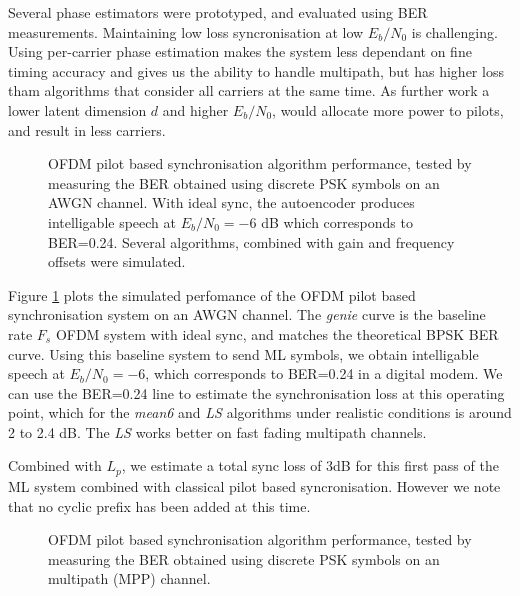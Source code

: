 \documentclass{article}
\begin{document}
Several phase estimators were prototyped, and evaluated using BER measurements. Maintaining low loss syncronisation at low $E_b/N_0$ is challenging.  Using per-carrier phase estimation makes the system less dependant on fine timing accuracy and gives us the ability to handle multipath, but has higher loss tham algorithms that consider all carriers at the same time.  As further work a lower latent dimension $d$ and higher $E_b/N_0$, would allocate more power to pilots, and result in less carriers.

\begin{figure}[h]
\caption{OFDM pilot based synchronisation algorithm performance, tested by measuring the BER obtained using discrete PSK symbols on an AWGN channel.  With ideal sync, the autoencoder produces intelligable speech at $E_b/N_0=-6$ dB which corresponds to BER=0.24.  Several algorithms, combined with gain and frequency offsets were simulated.}
\label{fig:ofdm_sync}
\begin{center}

\end{center}
\end{figure}

Figure \ref{fig:ofdm_sync} plots the simulated perfomance of the OFDM pilot based synchronisation system on an AWGN channel.  The \emph{genie} curve is the baseline rate $F_s$ OFDM system with ideal sync, and matches the theoretical BPSK BER curve.  Using this baseline system to send ML symbols, we obtain intelligable speech at $E_b/N_0=-6$, which corresponds to BER=0.24 in a digital modem.  We can use the BER=0.24 line to estimate the synchronisation loss at this operating point, which for the \emph{mean6} and \emph{LS} algorithms under realistic conditions is around 2 to 2.4 dB. The \emph{LS} works better on fast fading multipath channels.

Combined with $L_p$, we estimate a total sync loss of 3dB for this first pass of the ML system combined with classical pilot based syncronisation. However we note that no cyclic prefix has been added at this time.

\begin{figure}[h]
\caption{OFDM pilot based synchronisation algorithm performance, tested by measuring the BER obtained using discrete PSK symbols on an multipath (MPP) channel.}
\label{fig:ofdm_sync_mp}
\begin{center}

\end{center}
\end{figure}
\end{document}
